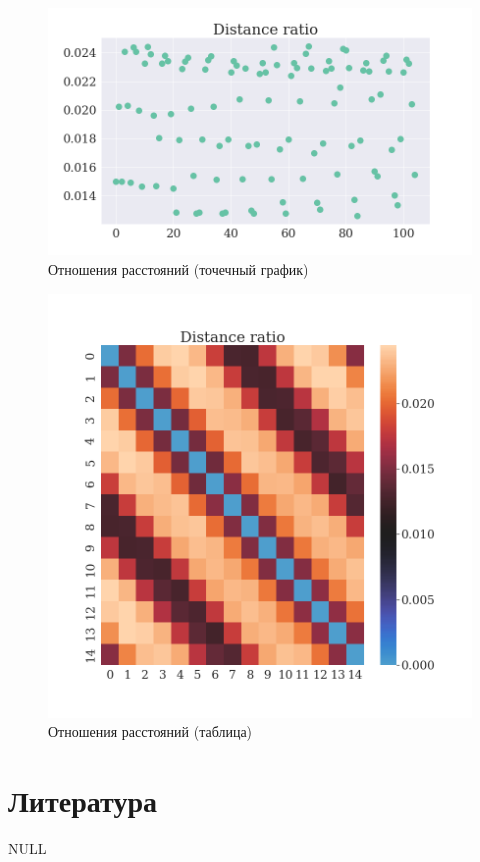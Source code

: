 \documentclass[a4paper,14pt]{article}
\theoremstyle{plain} %
\theoremstyle{definition} %
\theoremstyle{remark} %
\begin{document}
	\begin{figure}[bhtp]
		\centering
		\includegraphics[width=\linewidth]{../dist_ratio_plot.png}
		\caption{Отношения расстояний (точечный график)}
		\label{fig:dist_ratio_scatter}
	\end{figure}

	\begin{figure}[bhtp]
		\centering
		\includegraphics[width=\linewidth]{../dist_ratio_table.png}
		\caption{Отношения расстояний (таблица)}
		\label{fig:dist_ratio_table}
	\end{figure}

	\section{Литература}
	NULL
\end{document}
